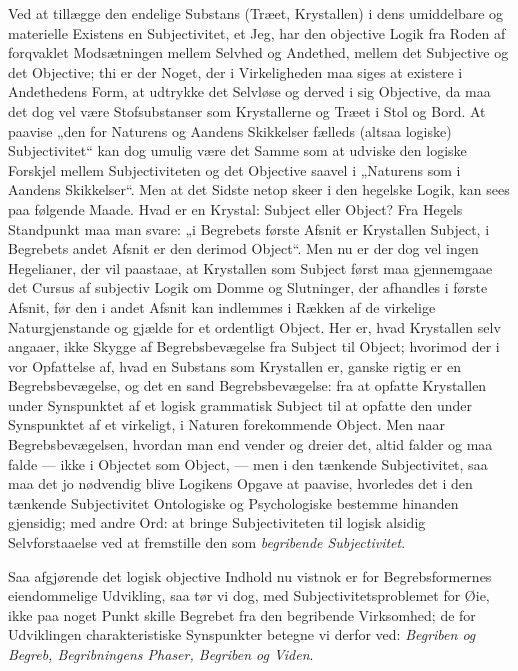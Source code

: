 \documentclass[11pt]{book}
\newcommand{\opage}[1]{\marginnote{\footnotesize\textit{[#1]}}}
\begin{document}
Ved at tillægge den endelige Substans (Træet, Krystallen) i dens
umiddelbare og materielle Existens en Subjectivitet, et Jeg, har den
objective Logik fra Roden af forqvaklet Modsætningen mellem Selvhed og
Andethed, mellem det Subjective og det Objective; thi er der Noget, der i
Virkeligheden maa siges at existere i Andethedens Form, at udtrykke det
Selvløse og derved i sig Objective, da maa det dog vel være Stofsubstanser
som Krystallerne og Træet i Stol og Bord. At paavise „den for Naturens og
Aandens Skikkelser fælleds (altsaa logiske) Subjectivitet“ kan dog umulig
være det Samme som at udviske den logiske Forskjel mellem Subjectiviteten
og det Objective saavel i „Naturens som i Aandens Skikkelser“. Men at det
Sidste netop skeer i den hegelske Logik, kan sees paa følgende Maade. Hvad
er en Krystal: Subject eller Object? Fra Hegels Standpunkt maa man svare:
„i Begrebets første Afsnit er Krystallen Subject, i Begrebets andet Afsnit
er den derimod Object“. Men nu er der dog vel ingen Hegelianer, der vil
paastaae, at Krystallen som Subject først maa gjennemgaae det Cursus af
subjectiv Logik om Domme og Slutninger, der afhandles i første Afsnit, før
den i andet Afsnit kan indlemmes i Rækken af de virkelige Naturgjenstande
og gjælde for et ordentligt Object. Her er, hvad Krystallen selv angaaer,
ikke Skygge af Begrebsbevægelse fra Subject til Object; hvorimod der i vor
Opfattelse af, hvad en Substans som Krystallen er, ganske rigtig er en
Begrebsbevægelse, og det en sand Begrebsbevægelse: fra at opfatte
Krystallen under Synspunktet af et logisk grammatisk Subject til at
opfatte den under Synspunktet af et virkeligt, i Naturen forekommende
Object. Men naar Begrebsbevægelsen, hvordan man end vender og dreier det,
altid falder og maa falde --- ikke i
\opage{143} \setcounter{footnote}{0}%
Objectet som Object, --- men i den tænkende Subjectivitet, saa maa det jo
nødvendig blive Logikens Opgave at paavise, hvorledes det i den tænkende
Subjectivitet Ontologiske og Psychologiske bestemme hinanden gjensidig;
med andre Ord: at bringe Subjectiviteten til logisk alsidig
Selvforstaaelse ved at fremstille den som \emph{begribende Subjectivitet}.

Saa afgjørende det logisk objective Indhold nu vistnok er for
Begrebsformernes eiendommelige Udvikling, saa tør vi dog, med
Subjectivitetsproblemet for Øie, ikke paa noget Punkt skille Begrebet fra
den begribende Virksomhed; de for Udviklingen charakteristiske Synspunkter
betegne vi derfor ved: \emph{Begriben og Begreb, Begribningens Phaser,
Begriben og Viden}.
\end{document}
